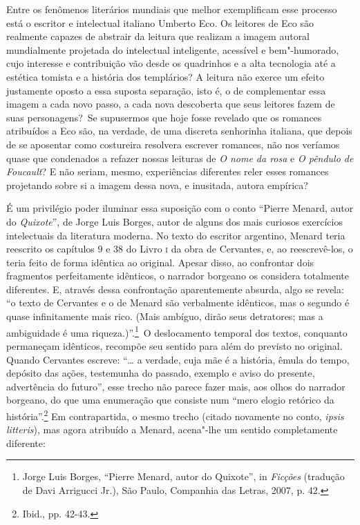 Entre os fenômenos literários mundiais que melhor exemplificam esse
processo está o escritor e intelectual italiano Umberto Eco. Os leitores
de Eco são realmente capazes de abstrair da leitura que realizam a
imagem autoral mundialmente projetada do intelectual inteligente,
acessível e bem"-humorado, cujo interesse e contribuição vão desde os
quadrinhos e a alta tecnologia até a estética tomista e a história dos
templários? A leitura não exerce um efeito justamente oposto a essa
suposta separação, isto é, o de complementar essa imagem a cada novo
passo, a cada nova descoberta que seus leitores fazem de suas
personagens?~Se supusermos que hoje fosse revelado que os romances
atribuídos a Eco são, na verdade, de uma discreta senhorinha italiana,
que depois de se aposentar como costureira resolvera escrever romances,
não nos veríamos quase que condenados a refazer nossas leituras de
\emph{O nome da rosa} e \emph{O pêndulo de Foucault}? E não seriam,
mesmo, experiências diferentes reler esses romances projetando sobre si
a imagem dessa nova, e inusitada, autora empírica?

É um privilégio poder iluminar essa suposição com o conto ``Pierre
Menard, autor do \emph{Quixote}'', de Jorge Luis Borges, autor de alguns
dos mais curiosos exercícios intelectuais da literatura moderna. No
texto do escritor argentino, Menard teria reescrito os capítulos 9 e 38
do Livro \textsc{i} da obra de Cervantes, e, ao reescrevê-los, o teria
feito de forma idêntica ao original. Apesar disso, ao confrontar dois
fragmentos perfeitamente idênticos, o narrador borgeano os considera
totalmente diferentes. E, através dessa confrontação aparentemente
absurda, algo se revela: ``o texto de Cervantes e o de Menard são
verbalmente idênticos, mas o segundo é quase infinitamente mais rico.
(Mais ambíguo, dirão seus detratores; mas a ambiguidade é uma
riqueza.)''.\footnote{Jorge Luis Borges, ``Pierre Menard, autor do
  Quixote'', in \emph{Ficções} (tradução de Davi Arrigucci Jr.), São
  Paulo, Companhia das Letras, 2007, p. 42.}~O deslocamento temporal dos
textos, conquanto permaneçam idênticos, recompõe seu sentido para além
do previsto no original. Quando Cervantes escreve: ``\ldots{} a verdade, cuja
mãe é a história, êmula do tempo, depósito das ações, testemunha do
passado, exemplo e aviso do presente, advertência do futuro'', esse
trecho não parece fazer mais, aos olhos do narrador borgeano, do que uma
enumeração que consiste num ``mero elogio retórico da
história''.\footnote{Ibid., pp. 42-43.} Em contrapartida, o mesmo trecho
(citado novamente no conto, \emph{ipsis litteris}), mas agora atribuído
a Menard, acena"-lhe um sentido completamente diferente:

